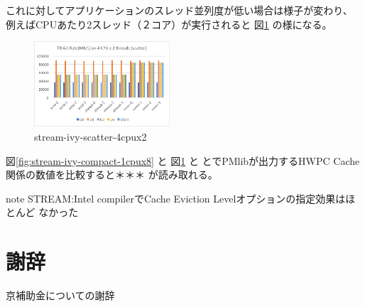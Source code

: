 \documentclass[submit,techrep,noauthor]{ipsj}
\begin{document}
これに対してアプリケーションのスレッド並列度が低い場合は様子が変わり、
例えばCPUあたり2スレッド（２コア）が実行されると
図\ref{fig:stream-ivy-scatter-4cpux2} の様になる。\\

\begin{figure}[tb]
\centering\includegraphics[width=0.45\textwidth]{figs/stream-ivy-scatter-4cpux2.png}
\caption{stream-ivy-scatter-4cpux2}
\label{fig:stream-ivy-scatter-4cpux2}
\end{figure}

図\ref{fig:stream-ivy-compact-1cpux8} と
図\ref{fig:stream-ivy-scatter-4cpux2} と
とでPMlibが出力するHWPC Cache関係の数値を比較すると＊＊＊
が読み取れる。


{ \color{blue} \par
note STREAM:Intel compilerでCache Eviction Levelオプションの指定効果はほとんど
なかった
} \par


\section{謝辞}
京補助金についての謝辞




%
\end{document}
